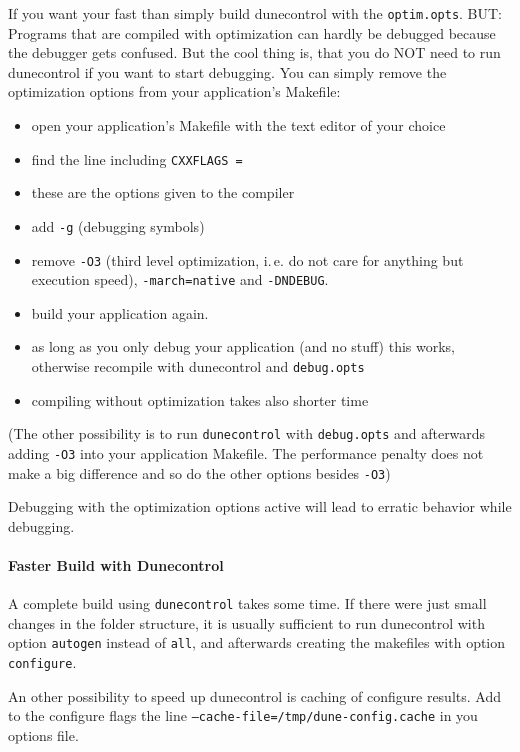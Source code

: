 If you want your \Dumux fast than simply build dunecontrol with the \texttt{optim.opts}. BUT: Programs that are compiled with optimization can hardly 
be debugged because the debugger gets confused. But the cool thing is, that you do NOT need to run dunecontrol if you want to start debugging. You can simply remove the optimization options from your application's Makefile:
\begin{itemize}
\item open your application's Makefile with the text editor of your choice
\item find the line including \texttt{CXXFLAGS =}
\item these are the options given to the \Cplusplus compiler
\item add \texttt{-g} (debugging symbols)
\item remove \texttt{-O3} (third level optimization, i.\,e. do not care for anything but execution speed),  \texttt{-march=native} and \texttt{-DNDEBUG}.
\item build your application again. 
\item as long as you only debug your application (and no \Dune stuff) this works, otherwise recompile with dunecontrol and \texttt{debug.opts}
\item compiling without optimization takes also shorter time
\end{itemize}

(The other possibility is to run \texttt{dunecontrol} with \texttt{debug.opts} and afterwards adding \texttt{-O3} into your application Makefile. The performance penalty does not make a big difference and so do the other options besides \texttt{-O3})

Debugging with the optimization options active will lead to erratic behavior while debugging. 

\paragraph{Faster Build with Dunecontrol}
A complete build using \texttt{dunecontrol} takes some time. If there were just small changes in the folder structure, it is usually sufficient to run dunecontrol with option \texttt{autogen} instead of \texttt{all}, and afterwards creating the makefiles with option \texttt{configure}.

An other possibility to speed up dunecontrol is caching of configure results. Add to the configure flags the line \texttt{--cache-file=/tmp/dune-config.cache} in you options file.

